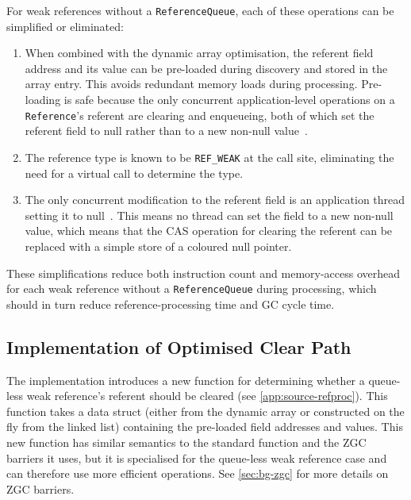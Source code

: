 For weak references without a \texttt{ReferenceQueue}, each of these operations can be simplified or eliminated:
\begin{enumerate}
    \item When combined with the dynamic array optimisation, the referent field address and its value can be pre-loaded during discovery and stored in the array entry. This avoids redundant memory loads during processing. Pre-loading is safe because the only concurrent application-level operations on a \texttt{Reference}'s referent are clearing and enqueueing, both of which set the referent field to null rather than to a new non-null value~\cite{openjdk-reference-java,openjdk-zreferenceprocessor-cpp}.
    \item The reference type is known to be \texttt{REF\_WEAK} at the call site, eliminating the need for a virtual call to determine the type.
    \item The only concurrent modification to the referent field is an application thread setting it to null~\cite{openjdk-reference-java,openjdk-zbarrier-cpp,openjdk-zreferenceprocessor-cpp}. This means no thread can set the field to a new non-null value, which means that the \ac{CAS} operation for clearing the referent can be replaced with a simple store of a coloured null pointer.
\end{enumerate}

These simplifications reduce both instruction count and memory-access overhead for each weak reference without a \texttt{ReferenceQueue} during processing, which should in turn reduce reference-processing time and \ac{GC} cycle time.

\subsection{Implementation of Optimised Clear Path}
\label{subsec:di-clear-impl}

The implementation introduces a new function for determining whether a queue-less weak reference's referent should be cleared (see \cref{app:source-refproc}). This function takes a data struct (either from the dynamic array or constructed on the fly from the linked list) containing the pre-loaded field addresses and values. This new function has similar semantics to the standard function and the \ac{ZGC} barriers it uses, but it is specialised for the queue-less weak reference case and can therefore use more efficient operations. See \cref{sec:bg-zgc} for more details on \ac{ZGC} barriers.

